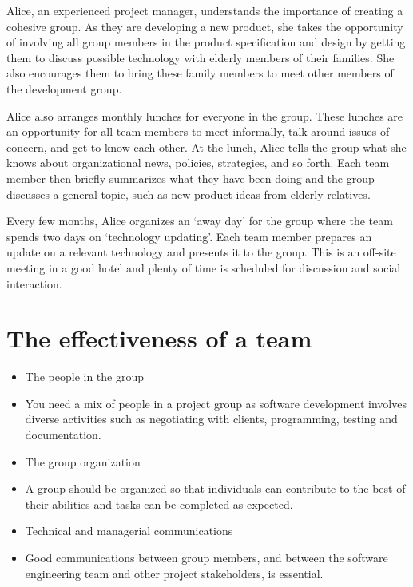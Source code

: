 Alice, an experienced project manager, understands the importance of creating a cohesive group. As they are developing a new product, she takes the opportunity of involving all group members in the product specification and design by getting them to discuss possible technology with elderly members of their families. She also encourages them to bring these family members to meet other members of the development group.


Alice also arranges monthly lunches for everyone in the group. These lunches are an opportunity for all team members to meet informally, talk around issues of concern, and get to know each other. At the lunch, Alice tells the group what she knows about organizational news, policies, strategies, and so forth. Each team member then briefly summarizes what they have been doing and the group discusses a general topic, such as new product ideas from elderly relatives.


Every few months, Alice organizes an ‘away day’ for the group where the team spends two days on ‘technology updating’. Each team member prepares an update on a relevant technology and presents it to the group. This is an off-site meeting in a good hotel and plenty of time is scheduled for discussion and social interaction.
\section{ The effectiveness of a team}
\begin{itemize}

\item The people in the group

  \item You need a mix of people in a project group as software development involves diverse activities such as negotiating with clients, programming, testing and documentation.

\item The group organization

  \item A group should be organized so that individuals can contribute to the best of their abilities and tasks can be completed as expected.

\item Technical and managerial communications

  \item Good communications between group members, and between the software engineering team and other project stakeholders, is essential.

\end{itemize}
